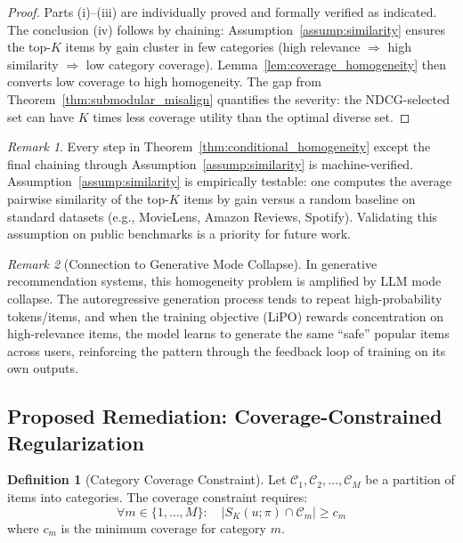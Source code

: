 \documentclass[11pt,a4paper]{article}
\theoremstyle{definition}
\newtheorem{definition}{Definition}[section]
\theoremstyle{plain}
\theoremstyle{remark}
\newtheorem{remark}{Remark}[section]
\begin{document}
\begin{proof}
Parts (i)--(iii) are individually proved and formally verified as indicated. The conclusion (iv) follows by chaining: Assumption~\ref{assump:similarity} ensures the top-$K$ items by gain cluster in few categories (high relevance $\Rightarrow$ high similarity $\Rightarrow$ low category coverage). Lemma~\ref{lem:coverage_homogeneity} then converts low coverage to high homogeneity. The gap from Theorem~\ref{thm:submodular_misalign} quantifies the severity: the NDCG-selected set can have $K$ times less coverage utility than the optimal diverse set.
\end{proof}

\begin{remark}
Every step in Theorem~\ref{thm:conditional_homogeneity} except the final chaining through Assumption~\ref{assump:similarity} is machine-verified. Assumption~\ref{assump:similarity} is empirically testable: one computes the average pairwise similarity of the top-$K$ items by gain versus a random baseline on standard datasets (e.g., MovieLens, Amazon Reviews, Spotify). Validating this assumption on public benchmarks is a priority for future work.
\end{remark}

\begin{remark}[Connection to Generative Mode Collapse]
\label{rem:mode_collapse}
In generative recommendation systems, this homogeneity problem is amplified by LLM mode collapse. The autoregressive generation process tends to repeat high-probability tokens/items, and when the training objective (LiPO) rewards concentration on high-relevance items, the model learns to generate the same ``safe'' popular items across users, reinforcing the pattern through the feedback loop of training on its own outputs.
\end{remark}

\subsection{Proposed Remediation: Coverage-Constrained Regularization}
\label{subsec:h2_remediation}

\begin{definition}[Category Coverage Constraint]
\label{def:coverage}
Let $\mathcal{C}_1, \mathcal{C}_2, \ldots, \mathcal{C}_M$ be a partition of items into categories. The coverage constraint requires:
\begin{equation}
    \forall m \in \{1, \ldots, M\}: \quad |S_K(u; \pi) \cap \mathcal{C}_m| \geq c_m
\end{equation}
where $c_m$ is the minimum coverage for category $m$.
\end{definition}
\end{document}
